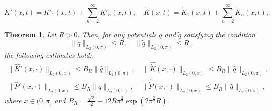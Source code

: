 \documentclass[10pt,a4paper]{amsart}
\newtheorem{theorem}{Theorem}
\begin{document}
\begin{equation} \label{der series}
K'(x, t) = K'_1(x,t) + \sum_{n=2}^\infty K'_{n}(x, t), \quad \dot K(x, t) = \dot K_1(x,t) + \sum_{n=2}^\infty \dot K_{n}(x, t),
\end{equation}

\begin{theorem} \label{trans stab}
Let $R>0.$ Then, for any potentials $q$ and $\tilde q$ satisfying the condition
$$\| q\|_{L_2(0, \pi)} \le R, \quad \| \tilde q \|_{L_2(0, \pi)}\le R,$$
 the following estimates hold:
\begin{equation} \label{K stability}
\begin{split} 
\| \hat K'(x, \cdot)\|_{L_2(0, x)} \le B_R \| \hat q\|_{L_2(0, \pi)}, \quad \| \hat{\dot{K}}(x, \cdot)\|_{L_2(0, x)} \le B_R \| \hat q\|_{L_2(0, \pi)},
\\ 
\| \hat P'(x, \cdot)\|_{L_2(0, x)} \le B_R \| \hat q\|_{L_2(0, \pi)}, \quad \| \hat{\dot {P}}(x, \cdot)\|_{L_2(0, x)} \le B_R \| \hat q\|_{L_2(0, \pi)}, 
\end{split} 
\end{equation}
where $x \in (0, \pi]$ and $B_R = \frac{\sqrt 2}{2} + 12R \pi^{\frac32}\exp(2\pi^{\frac32}R).$
\end{theorem}
\end{document}
